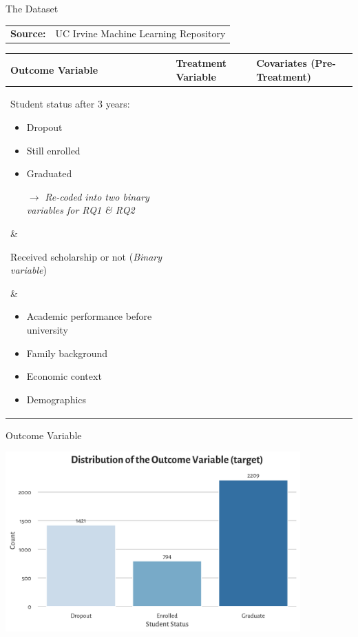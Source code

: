 \documentclass[aspectratio=169]{beamer}
\begin{document}
\begin{frame}{The Dataset}
\vspace{5pt}
\raggedright
\begin{tabular}{ll}
\textbf{Source:} & UC Irvine Machine Learning Repository \\
\end{tabular}
\begin{center}
\vspace{5pt}
\renewcommand{\arraystretch}{1.2}
\begin{tabularx}{\textwidth}{X | X | X}
\textbf{Outcome Variable} & \textbf{Treatment Variable} & \textbf{Covariates}  (Pre-Treatment)\\[0.5ex]
\hline \hline 
Student status after 3 years: 
\parbox[t]{4cm}{\vspace{-12pt} \begin{itemize}[label=--,leftmargin=1.2em,itemsep=1pt,topsep=2pt]
    \item Dropout
    \item Still enrolled
    \item Graduated
    \item[$\rightarrow$] \textit{Re-coded into two binary variables for RQ1 \& RQ2}
\end{itemize}} &

Received scholarship or not (\textit{Binary variable}) 

& \vspace{-27pt}
\parbox[t]{4cm}{\begin{itemize}[label=--,leftmargin=1.2em,itemsep=1pt,topsep=2pt]
    \item Academic performance before university
    \item Family background
    \item Economic context
    \item Demographics
\end{itemize}}

\end{tabularx}

\end{center}
\end{frame}


\begin{frame}{Outcome Variable}
	\begin{center}
     \includegraphics[width=0.85\textwidth]{Tex_Pictures/Graph1.png}
     \end{center}
\end{frame}
\end{document}
